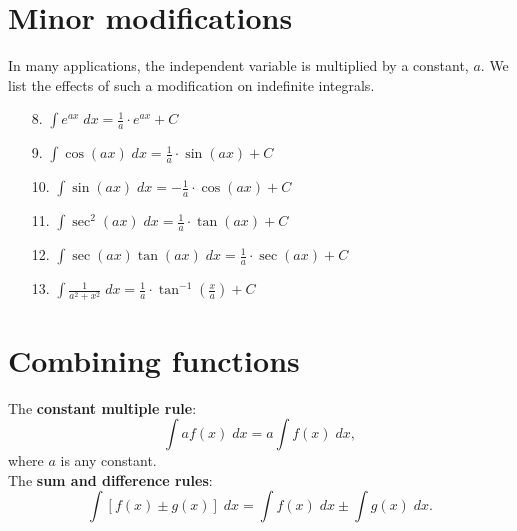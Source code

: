 \documentclass{ximera}
\begin{document}
\section{Minor modifications}

In many applications, the independent variable is multiplied by a constant, $a$. 
We list the effects of such a modification on indefinite integrals.

\begin{enumerate}

\item[8.] $\displaystyle{\int e^{ax} \; dx = \frac{1}{a} \cdot e^{ax} + C}$


\item[9.] $\displaystyle{\int \cos(ax) \; dx = \frac{1}{a} \cdot \sin(ax) + C}$

\item[10.] $\displaystyle{\int \sin(ax) \; dx = -\frac{1}{a} \cdot \cos(ax) + C}$

\item[11.] $\displaystyle{\int \sec^2(ax) \; dx = \frac{1}{a} \cdot \tan(ax) + C}$

\item[12.] $\displaystyle{\int \sec(ax)\tan(ax) \; dx = \frac{1}{a} \cdot \sec(ax) + C}$

\item[13.] $\displaystyle{\int \frac{1}{a^2 + x^2} \; dx = \frac{1}{a} \cdot \tan^{-1}\left(\frac{x}{a}\right) + C}$

\end{enumerate}

\section{Combining functions}

The \textbf{constant multiple rule}:
\[
\int af(x) \; dx = a\int f(x) \; dx,
\]
where $a$ is any constant.\\

The \textbf{sum and difference rules}:
\[
\int \left[f(x) \pm g(x) \right] \; dx = \int f(x) \; dx \pm \int g(x) \; dx.
\]
\end{document}
